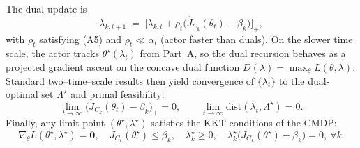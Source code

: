 \documentclass{article} %
\begin{document}
The dual update is
\begin{equation}
\label{eq:dual_update}
\lambda_{k,t+1} \;=\; \Big[\lambda_{k,t} + \rho_t\big(\widehat{J}_{C_k}(\theta_t)-\beta_k\big)\Big]_+,
\end{equation}
with $\rho_t$ satisfying (A5) and $\rho_t\ll\alpha_t$ (actor faster than duals). On the slower time scale, the actor tracks $\theta^\star(\lambda_t)$ from Part~A, so the dual recursion behaves as a projected gradient ascent on the concave dual function $D(\lambda)=\max_\theta L(\theta,\lambda)$. Standard two–time–scale results then yield convergence of $\{\lambda_t\}$ to the dual-optimal set $\Lambda^\star$ and primal feasibility:
\begin{equation}
\lim_{t\to\infty} \big(J_{C_k}(\theta_t)-\beta_k\big)_+ = 0, \qquad
\lim_{t\to\infty} \mathrm{dist}(\lambda_t,\Lambda^\star)=0.
\end{equation}
Finally, any limit point $(\theta^\star,\lambda^\star)$ satisfies the KKT conditions of the CMDP:
\begin{equation}
\nabla_\theta L(\theta^\star,\lambda^\star)=\mathbf 0,\quad
J_{C_k}(\theta^\star)\le \beta_k,\quad
\lambda_k^\star\ge 0,\quad
\lambda_k^\star\big(J_{C_k}(\theta^\star)-\beta_k\big)=0,\ \forall k.
\end{equation}
\end{document}
